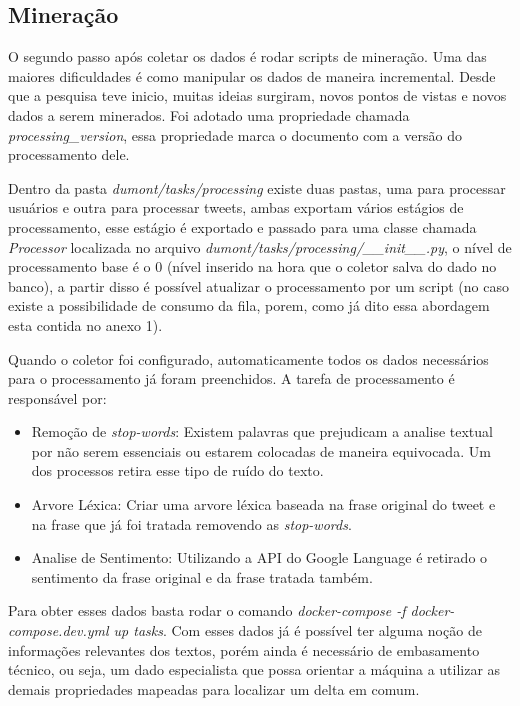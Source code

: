 \subsection{Mineração}
O segundo passo após coletar os dados é rodar scripts de mineração. Uma das maiores dificuldades é como manipular os dados de maneira incremental. Desde que a pesquisa teve inicio, muitas ideias surgiram, novos pontos de vistas e novos dados a serem minerados. Foi adotado uma propriedade chamada \textit{processing\_version}, essa propriedade marca o documento com a versão do processamento dele.

Dentro da pasta \textit{dumont/tasks/processing} existe duas pastas, uma para processar usuários e outra para processar tweets, ambas exportam vários estágios de processamento, esse estágio é exportado e passado para uma classe chamada \textit{Processor} localizada no arquivo \textit{dumont/tasks/processing/\_\_init\_\_.py}, o nível de processamento base é o 0 (nível inserido na hora que o coletor salva do dado no banco), a partir disso é possível atualizar o processamento por um script (no caso existe a possibilidade de consumo da fila, porem, como já dito essa abordagem esta contida no anexo 1).

Quando o coletor foi configurado, automaticamente todos os dados necessários para o processamento já foram preenchidos. A tarefa de processamento é responsável por:

\begin{itemize}
    \item Remoção de \textit{stop-words}: Existem palavras que prejudicam a analise textual por não serem essenciais ou estarem colocadas de maneira equivocada. Um dos processos retira esse tipo de ruído do texto.
    \item Arvore Léxica: Criar uma arvore léxica baseada na frase original do tweet e na frase que já foi tratada removendo as \textit{stop-words}.
    \item Analise de Sentimento: Utilizando a API do Google Language é retirado o sentimento da frase original e da frase tratada também.
\end{itemize}

Para obter esses dados basta rodar o comando \textit{docker-compose -f docker-compose.dev.yml up tasks}. Com esses dados já é possível ter alguma noção de informações relevantes dos textos, porém ainda é necessário de embasamento técnico, ou seja, um dado especialista que possa orientar a máquina a utilizar as demais propriedades mapeadas para localizar um delta em comum.


